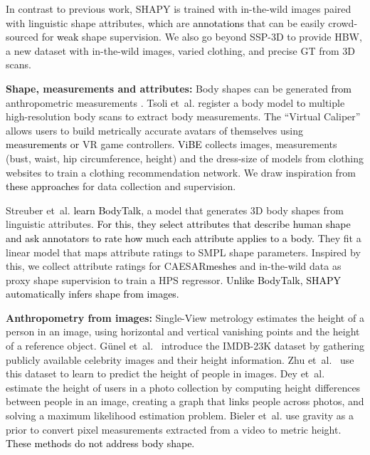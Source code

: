 \documentclass[10pt,twocolumn,letterpaper]{article}
\newcommand{\zheading}[1]{\textbf{#1:}}
\newcommand{\modelCOLOR}{black}
\newcommand{\modelname}{{\color{\modelCOLOR}SHAPY}\xspace}
\newcommand{\vcaliper}{``Virtual Caliper''\xspace}
\newcommand{\virtualcaliper}{\vcaliper}
\newcommand{\threeD}{3D\xspace}
\newcommand{\ssp}{\mbox{SSP-\threeD}\xspace}
\newcommand{\hbw}{\mbox{HBW}\xspace}
\newcommand{\bodytalk}{\mbox{BodyTalk}\xspace}
\newcommand{\smpl}{\mbox{SMPL}\xspace}
\newcommand{\caesar}{\mbox{CAESAR}\xspace}
\newcommand{\inthewild}{\mbox{in-the-wild}\xspace}
\renewcommand{\etal}{\mbox{et al.}\xspace}
\newcommand{\cameraready}[1]{\textcolor{Fuchsia}{{#1}}\xspace}
\renewcommand{\cameraready}[1]{\textcolor{black}{{#1}}\xspace}
\newcommand{\colorTERM}{blue}
\renewcommand{\colorTERM}{black}
\newcommand{\measurements}[0]{{\color{\colorTERM}anthropometric measurements}\xspace}
\newcommand{\linguisticattributes}[0]{{\color{\colorTERM}linguistic attributes}\xspace}
\newcommand{\linguisticshapeattributes}[0]{{\color{\colorTERM}linguistic shape attributes}\xspace}
\begin{document}
In contrast to previous work, \modelname is trained with \inthewild images paired with \linguisticshapeattributes, which are 
\cameraready{annotations} 
that can be easily crowd-sourced for \cameraready{weak} shape supervision.
We also go beyond \ssp to provide \hbw, a new dataset with in-the-wild images, varied clothing, and precise GT from \threeD scans.




\zheading{Shape, measurements and attributes}
Body shapes can be generated 
\cameraready{from}
\measurements
\cite{allen2003space,seo2003synthesizing,seo2003automatic}.
Tsoli \etal \cite{tsoliWACV14} register a body model to multiple high-resolution body scans to extract body measurements. 
The \virtualcaliper \cite{pujades2019virtual} allows users to build metrically accurate avatars of themselves using \cameraready{measurements or} VR game controllers.
\cameraready{ViBE} \cite{hsiao2020vibe} collects images, measurements (bust, waist, hip circumference, height) and the dress-size of models
from clothing websites to train a clothing recommendation network.
We draw inspiration from 
\cameraready{these approaches} 
for data collection and supervision.

Streuber \etal \cite{Streuber:SIGGRAPH:2016} \cameraready{learn \bodytalk}, a model that generates
\threeD
body shapes from \linguisticattributes.
\cameraready{For this, they select
attributes that describe human shape and
ask annotators to rate how much each attribute applies
to a body.}
They fit a linear model that maps attribute
ratings to \smpl shape parameters. 
Inspired by this, we collect attribute ratings for \caesar \cameraready{meshes \cite{CAESAR}}  and \inthewild data as proxy shape supervision to train a HPS regressor.
\cameraready{Unlike \bodytalk,
\modelname  automatically infers shape from images.}



\zheading{Anthropometry from images} 
Single-View metrology \cite{criminisi2000single}
estimates the height of a person in an image, using horizontal and vertical vanishing points and the height of a reference object.
G{\"u}nel \etal~\cite{gunel2019face} introduce the IMDB-23K dataset by gathering publicly available celebrity images and their height information.
Zhu \etal~\cite{SingleViewMetrology} use this dataset to learn to predict the height of people in images.
Dey \etal~\cite{Ratan2014} estimate the height of users in a photo collection by computing height differences between people in an image, creating a graph that links people across photos, and solving a maximum likelihood estimation problem. Bieler \etal \cite{Bieler_2019_ICCV} use gravity as a prior to convert pixel measurements extracted from a video to metric height.
\cameraready{These methods do not address body shape.}
\end{document}
